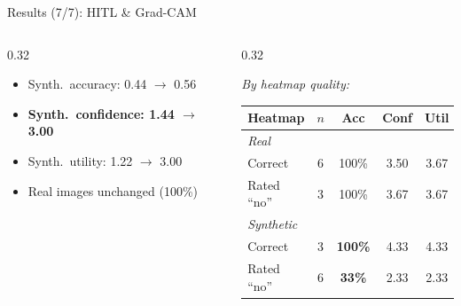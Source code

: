 \documentclass[aspectratio=169]{beamer}
\begin{document}
\begin{frame}{Results (7/7): HITL \& Grad-CAM}
\begin{columns}[T]
\begin{column}{0.32\textwidth}
      \vspace{0.2em}
      \begin{center}
      \begin{minipage}{0.92\linewidth}
      {%
      \begin{exampleblock}{}\tiny
        \begin{itemize}\itemsep1pt\setlength{\leftmargini}{1em}
          \item Synth.\ accuracy: 0.44 $\to$ 0.56
          \item \textbf{Synth.\ confidence: 1.44 $\to$ 3.00}
          \item Synth.\ utility: 1.22 $\to$ 3.00
          \item Real images unchanged (100\%)
        \end{itemize}
      \end{exampleblock}}
      \end{minipage}
      \end{center}
    \end{column}
    \begin{column}{0.32\textwidth}
      \begin{minipage}[t][2.9cm][t]{\linewidth}
      \textit{\scriptsize By heatmap quality:}\\[3pt]
      \tiny
      \begin{tabular*}{\linewidth}{@{\extracolsep{\fill}}lcccc}
        \toprule
        Heatmap & $n$ & Acc & Conf & Util \\
        \midrule
        \multicolumn{5}{l}{\textit{Real}} \\
        \;Correct      & 6 & 100\%          & 3.50 & 3.67 \\
        \;Rated ``no'' & 3 & 100\%          & 3.67 & 3.67 \\
        \midrule
        \multicolumn{5}{l}{\textit{Synthetic}} \\
        \;\textcolor{mygreen}{Correct}    & 3 & \textbf{100\%} & 4.33 & 4.33 \\
        \;\textcolor{myred}{Rated ``no''} & 6 & \textbf{33\%}  & 2.33 & 2.33 \\
        \bottomrule
      \end{tabular*}
      \end{minipage}


\end{column}
\end{columns}
\end{frame}
\end{document}
